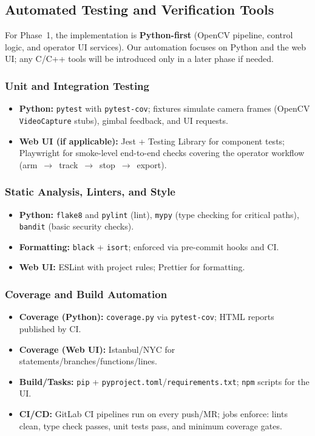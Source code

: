 \documentclass[12pt, titlepage]{article}
\begin{document}
\subsection{Automated Testing and Verification Tools}

For Phase~1, the implementation is \textbf{Python-first} (OpenCV pipeline,
control logic, and operator UI services). Our automation focuses on Python and
the web UI; any C/C++ tools will be introduced only in a later phase if needed.

\subsubsection*{Unit and Integration Testing}
\begin{itemize}
  \item \textbf{Python:} \texttt{pytest} with \texttt{pytest-cov}; fixtures
        simulate camera frames (OpenCV \texttt{VideoCapture} stubs), gimbal feedback,
        and UI requests.
  \item \textbf{Web UI (if applicable):} Jest + Testing Library for component
        tests; Playwright for smoke-level end-to-end checks covering the operator
        workflow (arm~$\rightarrow$~track~$\rightarrow$~stop~$\rightarrow$~export).
\end{itemize}

\subsubsection*{Static Analysis, Linters, and Style}
\begin{itemize}
  \item \textbf{Python:} \texttt{flake8} and \texttt{pylint} (lint),
        \texttt{mypy} (type checking for critical paths), \texttt{bandit} (basic security checks).
  \item \textbf{Formatting:} \texttt{black} + \texttt{isort}; enforced
        via pre-commit hooks and CI.
  \item \textbf{Web UI:} ESLint with project rules; Prettier for formatting.
\end{itemize}

\subsubsection*{Coverage and Build Automation}
\begin{itemize}
  \item \textbf{Coverage (Python):} \texttt{coverage.py} via \texttt{pytest-cov};
        HTML reports published by CI.
  \item \textbf{Coverage (Web UI):} Istanbul/NYC for statements/branches/functions/lines.
  \item \textbf{Build/Tasks:} \texttt{pip} + \texttt{pyproject.toml}/\texttt{requirements.txt};
        \texttt{npm} scripts for the UI.
  \item \textbf{CI/CD:} GitLab CI pipelines run on every push/MR; jobs enforce: lints clean,
        type check passes, unit tests pass, and minimum coverage gates.
\end{itemize}
\end{document}
